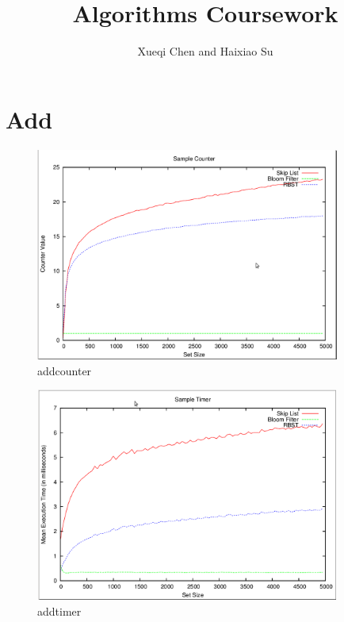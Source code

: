 \documentclass[11pt]{article}
\begin{document}
\title{Algorithms Coursework}
\author{Xueqi Chen and Haixiao Su}

\maketitle
\section{Add}
\begin{figure}[ht]
\centering
\includegraphics[height=70mm,width=100mm]{addcounter.png}
\caption{addcounter}
\end{figure}
\begin{figure}[ht]
\centering
\includegraphics[height=70mm,width=100mm]{addtimer.png}
\caption{addtimer}
\end{figure}
\end{document}
